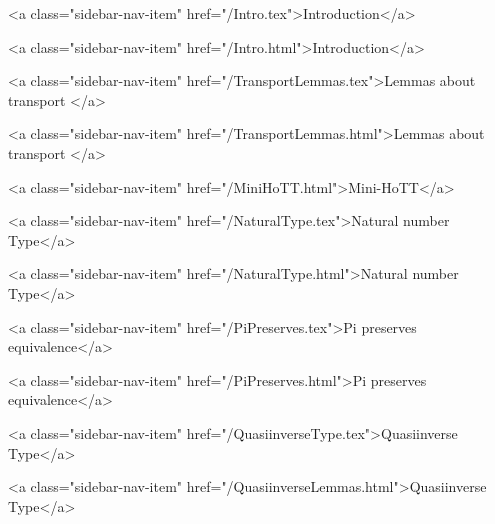       
    
      
        
          <a class="sidebar-nav-item" href="/Intro.tex">Introduction</a>
        
      
    
      
        
          <a class="sidebar-nav-item" href="/Intro.html">Introduction</a>
        
      
    
      
        
          <a class="sidebar-nav-item" href="/TransportLemmas.tex">Lemmas about transport </a>
        
      
    
      
        
          <a class="sidebar-nav-item" href="/TransportLemmas.html">Lemmas about transport </a>
        
      
    
      
        
          <a class="sidebar-nav-item" href="/MiniHoTT.html">Mini-HoTT</a>
        
      
    
      
        
          <a class="sidebar-nav-item" href="/NaturalType.tex">Natural number Type</a>
        
      
    
      
        
          <a class="sidebar-nav-item" href="/NaturalType.html">Natural number Type</a>
        
      
    
      
        
          <a class="sidebar-nav-item" href="/PiPreserves.tex">Pi preserves equivalence</a>
        
      
    
      
        
          <a class="sidebar-nav-item" href="/PiPreserves.html">Pi preserves equivalence</a>
        
      
    
      
        
          <a class="sidebar-nav-item" href="/QuasiinverseType.tex">Quasiinverse Type</a>
        
      
    
      
        
          <a class="sidebar-nav-item" href="/QuasiinverseLemmas.html">Quasiinverse Type</a>
        
